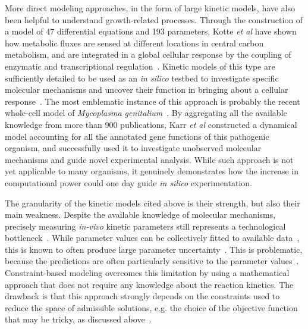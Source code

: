 More direct modeling approaches, in the form of large kinetic models, have also been helpful to understand growth-related processes.
Through the construction of a model of 47 differential equations and 193 parameters, Kotte \textit{et al} have shown how metabolic fluxes are sensed at different locations in central carbon metabolism, and are integrated in a global cellular response by the coupling of enzymatic and transcriptional regulation~\cite{kotte_bacterial_2010}.
Kinetic models of this type are sufficiently detailed to be used as an \textit{in silico} testbed to investigate specific molecular mechanisms and uncover their function in bringing about a cellular response~\cite{peskov_kinetic_2012}.
The most emblematic instance of this approach is probably the recent whole-cell model of \textit{Mycoplasma genitalium}~\cite{karr_whole-cell_2012}.
By aggregating all the available knowledge from more than 900 publications, Karr \textit{et al} constructed a dynamical model accounting for all the annotated gene functions of this pathogenic organism, and successfully used it to investigate unobserved molecular mechanisms and guide novel experimental analysis.
While such approach is not yet applicable to many organisms, it genuinely demonstrates how the increase in computational power could one day guide \textit{in silico} experimentation.

The granularity of the kinetic models cited above is their strength, but also their main weakness.
Despite the available knowledge of molecular mechanisms, precisely measuring \textit{in-vivo} kinetic parameters still represents a technological bottleneck~\cite{park_metabolite_2016,bennett_absolute_2009,buscher_cross-platform_2009}.
While parameter values can be collectively fitted to available data~\cite{jaqaman_linking_2006,mendes_non-linear_1998}, this is known to often produce large parameter uncertainty~\cite{cho_experimental_2003,brodersen_characterization_1987,rodriguez-fernandez_hybrid_2006}.
This is problematic, because the predictions are often particularly sensitive to the parameter values~\cite{gutenkunst_universally_2007,ingram_network_2006,mayo_plasticity_2006}.
Constraint-based modeling overcomes this limitation by using a mathematical approach that does not require any knowledge about the reaction kinetics.
The drawback is that this approach strongly depends on the constraints used to reduce the space of admissible solutions, e.g. the choice of the objective function that may be tricky, as discussed above~\cite{kauffman_advances_2003}.

